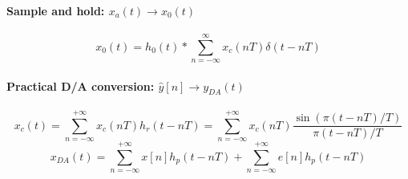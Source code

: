 \paragraph{Sample and hold: $x_{a}(t) \to x_{0}(t)$}
\[
    x_0(t) = h_0(t) * \sum_{n=-\infty}^{\infty} x_{c}(nT)\delta(t-nT)
\]

\paragraph{Practical D/A conversion: $\hat{y}[n] \to y_{DA}(t)$}
\[
    x_{c}(t) = \sum_{n=-\infty}^{+\infty} x_{c}(nT)h_{r}(t-nT) = \sum_{n=-\infty}^{+\infty} x_{c}(nT) \frac{\sin(\pi(t-nT)/T)}{\pi(t-nT)/T}
\]
\[
    x_{DA}(t) = \sum_{n=-\infty}^{+\infty} x[n]h_{p}(t-nT) + \sum_{n=-\infty}^{+\infty} e[n]h_{p}(t-nT)
\]

